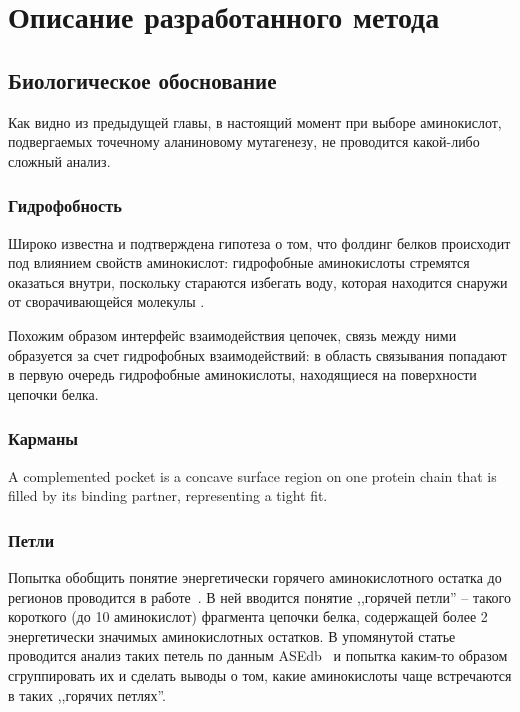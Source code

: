 \graphicspath{{../images/algorithm/}}
\chapter{Описание разработанного метода}

\section{Биологическое обоснование}
Как видно из предыдущей главы,  в настоящий момент при выборе аминокислот, подвергаемых точечному аланиновому мутагенезу, не проводится какой-либо сложный анализ.



\subsection{Гидрофобность}
Широко известна и подтверждена гипотеза о том, что фолдинг белков происходит под влиянием свойств аминокислот: гидрофобные аминокислоты стремятся оказаться внутри, поскольку стараются избегать воду, которая находится снаружи от сворачивающейся молекулы \cite{hydrophoby}.

Похожим образом интерфейс взаимодействия цепочек, связь между ними образуется за счет гидрофобных взаимодействий: в область связывания попадают в первую очередь гидрофобные аминокислоты, находящиеся на поверхности цепочки белка.

\subsection{Карманы}
A complemented pocket is a concave surface
region on one protein chain that is filled by its
binding partner, representing a tight fit.
\cite{pockets2004}
\subsection{Петли}
Попытка обобщить понятие энергетически горячего аминокислотного остатка до регионов проводится в работе~\cite{loops2014}. В ней вводится понятие ,,горячей петли'' -- такого короткого (до 10 аминокислот) фрагмента  цепочки белка, содержащей более 2 энергетически значимых аминокислотных остатков. В упомянутой статье проводится анализ таких петель по данным ASEdb~\cite{asedb2001} и попытка каким-то образом сгруппировать их и сделать выводы о том, какие аминокислоты чаще встречаются в таких ,,горячих петлях''.

